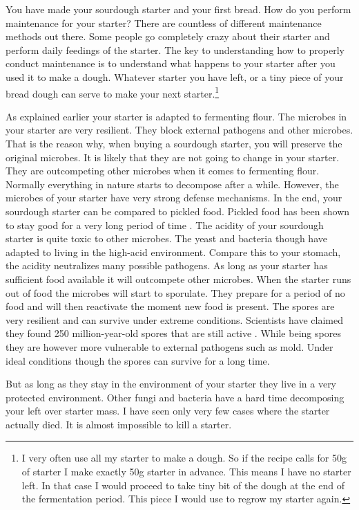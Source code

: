 You have made your sourdough starter and your first bread. How do you perform
maintenance for your starter? There are countless of different maintenance
methods out there. Some people go completely crazy about their starter and
perform daily feedings of the starter. The key to understanding how to properly
conduct maintenance is to understand what happens to your starter after you
used it to make a dough. Whatever starter you have left, or a tiny piece of
your bread dough can serve to make your next starter.\footnote{I very often use all my
starter to make a dough. So if the recipe calls for 50g of starter I make
exactly 50g starter in advance. This means I have no starter left. In that
case I would proceed to take tiny bit of the dough at the end of the
fermentation period. This piece I would use to regrow my starter again.}


As explained earlier your starter is adapted
to fermenting flour. The microbes in your starter are very resilient. They
block external pathogens and other microbes. That is the reason why, when
buying a sourdough starter, you will preserve the original microbes. It is
likely that they are not going to change in your starter. They are outcompeting other
microbes when it comes to fermenting flour. Normally everything in nature
starts to decompose after a while. However, the microbes of your starter have
very strong defense mechanisms. In the end, your sourdough starter can be
compared to pickled food. Pickled food has been shown to stay good for a very
long period of time \cite{pickled+foods+expiration}. The acidity of your sourdough starter is quite
toxic to other microbes. The yeast and bacteria though have adapted to living
in the high-acid environment. Compare this to your stomach, the acidity
neutralizes many possible pathogens. As long as your starter has sufficient
food available it will outcompete other microbes. When the starter runs out of
food the microbes will start to sporulate. They prepare for a period of no
food and will then reactivate the moment new food is present. The
spores are very resilient and can survive under extreme conditions.
Scientists have claimed they found 250 million-year-old spores that are still
active \cite{old+spores}. While being spores
they are however more vulnerable to external pathogens such as mold.
Under ideal conditions though the spores can survive for a
long time.

But as long as they stay in the environment of your starter they live
in a very protected environment. Other fungi and bacteria have a hard time decomposing your left over starter mass.
I have seen only very few cases where the starter actually died. It is almost impossible
to kill a starter.

